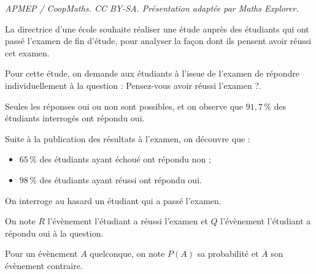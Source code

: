 \documentclass[10pt]{article}
\begin{document}
\noindent\textit{APMEP / CoopMaths. CC BY-SA. Présentation adaptée par Maths Explorer.}\par\medskip
\medskip

La directrice d'une école souhaite réaliser une étude auprès des étudiants qui ont passé l'examen de fin d'étude, pour analyser la façon dont ils pensent avoir réussi cet examen.

\smallskip

Pour cette étude, on demande aux étudiants à l'issue de l'examen de répondre individuellement à la question : \og Pensez-vous avoir réussi l'examen ?\fg.

\smallskip

Seules les réponses  \og oui\fg{} ou \og non \fg{} sont possibles, et on observe que $91,7\,\%$ des étudiants interrogés ont répondu \og oui\fg.

Suite à la publication des résultats à l'examen, on découvre que :
\begin{itemize}
	\item $65\,\%$ des étudiants ayant échoué ont répondu \og non\fg{} ;
	\item $98\,\%$ des étudiants ayant réussi ont répondu \og oui\fg.
\end{itemize}

On interroge au hasard un étudiant qui a passé l'examen.

On note $R$ l'évènement \og l'étudiant a réussi l'examen \fg{} et $Q$ l'évènement \og l'étudiant a répondu \og oui\fg{}  à la question\fg{}.

Pour un évènement $A$ quelconque, on note $P(A)$ sa probabilité et $\overline{A}$ son évènement contraire.

\medskip
\end{document}
